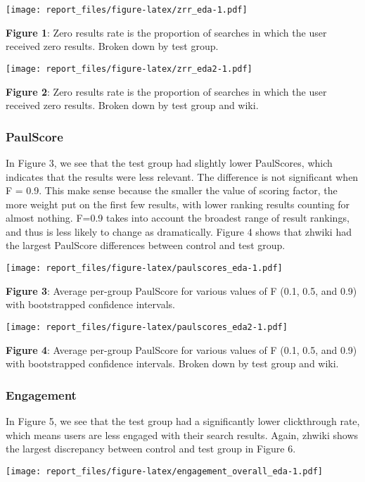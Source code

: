 \documentclass[12pt,]{article}
\begin{document}
\texttt{[image: report\_files/figure-latex/zrr\_eda-1.pdf]}

\textbf{Figure 1}: Zero results rate is the proportion of searches in
which the user received zero results. Broken down by test group.

\texttt{[image: report\_files/figure-latex/zrr\_eda2-1.pdf]}

\textbf{Figure 2}: Zero results rate is the proportion of searches in
which the user received zero results. Broken down by test group and
wiki.

\hypertarget{paulscore}{\subsubsection{PaulScore}\label{paulscore}}

In Figure 3, we see that the test group had slightly lower PaulScores,
which indicates that the results were less relevant. The difference is
not significant when F = 0.9. This make sense because the smaller the
value of scoring factor, the more weight put on the first few results,
with lower ranking results counting for almost nothing. F=0.9 takes into
account the broadest range of result rankings, and thus is less likely
to change as dramatically. Figure 4 shows that zhwiki had the largest
PaulScore differences between control and test group.

\texttt{[image: report\_files/figure-latex/paulscores\_eda-1.pdf]}

\textbf{Figure 3}: Average per-group PaulScore for various values of F
(0.1, 0.5, and 0.9) with bootstrapped confidence intervals.

\texttt{[image: report\_files/figure-latex/paulscores\_eda2-1.pdf]}

\textbf{Figure 4}: Average per-group PaulScore for various values of F
(0.1, 0.5, and 0.9) with bootstrapped confidence intervals. Broken down
by test group and wiki.

\hypertarget{engagement}{\subsubsection{Engagement}\label{engagement}}

In Figure 5, we see that the test group had a significantly lower
clickthrough rate, which means users are less engaged with their search
results. Again, zhwiki shows the largest discrepancy between control and
test group in Figure 6.

\texttt{[image: report\_files/figure-latex/engagement\_overall\_eda-1.pdf]}
\end{document}
